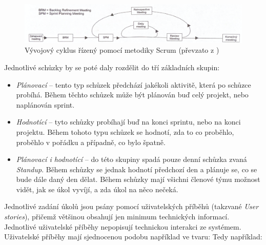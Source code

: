 \documentclass[czech,master]{diploma}
\begin{document}
\begin{figure}[!ht]
    \centering
    \includegraphics[width=1\textwidth]{Diplomka/Figures/scrum.png}
    \caption{Vývojový cyklus řízený pomocí metodiky Scrum (převzato z \cite{ref:scrum_myslin_cyklus_img})}
    \label{fig:scrum_cyklus}
\end{figure}

Jednotlivé schůzky by se poté daly rozdělit do tří základních skupin:

\begin{itemize}
\item \textit{Plánovací} -- tento typ schůzek předchází jakékoli aktivitě, která po schůzce probíhá. Během těchto schůzek může být plánován buď celý projekt, nebo naplánován sprint.
\item \textit{Hodnotící} -- tyto schůzky probíhají buď na konci sprintu, nebo na konci projektu. Během tohoto typu schůzek se hodnotí, zda to co proběhlo, proběhlo v pořádku a případně, co bylo špatně.
\item \textit{Plánovací i hodnotící} -- do této skupiny spadá pouze denní schůzka zvaná \textit{Standup}. Během schůzky se jednak hodnotí předchozí den a plánuje se, co se bude dále daný den dělat. Během schůzky mají všichni členové týmu možnost vidět, jak se úkol vyvíjí, a zda úkol na něco nečeká.
\end{itemize}


Jednotlivé zadání úkolů jsou psány pomocí uživatelských příběhů (takzvané \textit{User stories}), přičemž většinou obsahují jen minimum technických informací. Jednotlivé uživatelské příběhy nepopisují technickou interakci ze systémem. Uživatelské příběhy mají  sjednocenou podobu například ve tvaru:  Tedy například:  \cite{ref:scrum_myslin_us}
\end{document}
